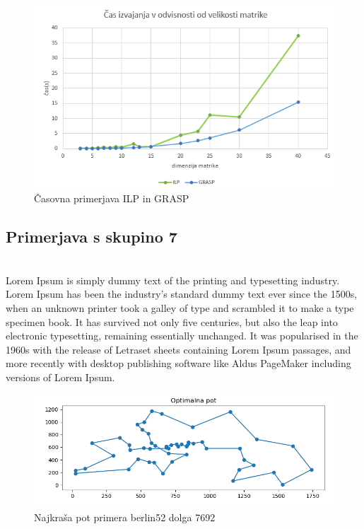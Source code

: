 \documentclass[12pt,a4paper]{amsart}
\theoremstyle{definition} %
\theoremstyle{plain} %
\begin{document}
\begin{figure}[h]
\caption{Časovna primerjava ILP in GRASP}
\centering
\includegraphics[scale =0.8]{casilp}
\end{figure}


\subsection{Primerjava s skupino 7} ~\\

Lorem Ipsum is simply dummy text of the printing and typesetting industry. Lorem Ipsum has been the industry's standard dummy text ever since the 1500s, when an unknown printer took a galley of type and scrambled it to make a type specimen book. It has survived not only five centuries, but also the leap into electronic typesetting, remaining essentially unchanged. It was popularised in the 1960s with the release of Letraset sheets containing Lorem Ipsum passages, and more recently with desktop publishing software like Aldus PageMaker including versions of Lorem Ipsum.

\begin{figure}[h]
\caption{Najkraša pot primera berlin52 dolga 7692}
\centering
\includegraphics[scale =0.5]{berlin_7692}
\end{figure}
\end{document}
